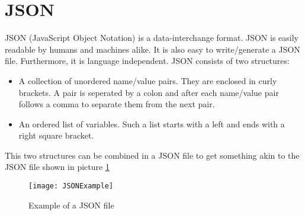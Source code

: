 \section{JSON}
JSON (JavaScript Object Notation) \cite{json_url} is a data-interchange format. JSON is easily readable by humans and machines alike. It is also easy to write/generate a JSON file. Furthermore, it is language independent.\newline
JSON consists of two structures:
\begin{itemize}
	\item A collection of unordered name/value pairs. They are enclosed in curly brackets. A pair is seperated by a colon and after each name/value pair follows a comma to separate them from the next pair.
	\item An ordered list of variables. Such a list starts with a left and ends with a right square bracket.
\end{itemize}
This two structures can be combined in a JSON file to get something akin to the JSON file shown in picture \ref{figure4}

\begin{figure}[H]
	\centering
	\texttt{[image: JSONExample]}
	\caption{Example of a JSON file}
	\label{figure4}
\end{figure}